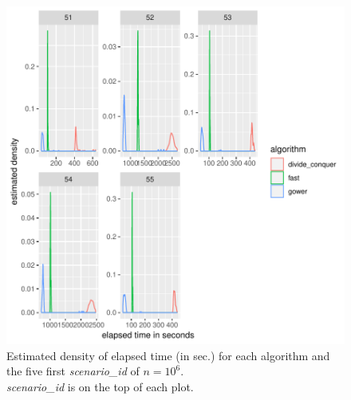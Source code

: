 \documentclass[11pt]{report}
\begin{document}
\begin{figure}[h]
\centering
    \includegraphics{./images/elapsed_time_1000000_part1.pdf}
    \caption{
    Estimated density of elapsed time (in sec.) for each algorithm and the five 
    first \textit{scenario\_id} of $n=10^6$.\\
    \textit{scenario\_id} is on the top of each plot.
    }
\end{figure}

\FloatBarrier
\end{document}
